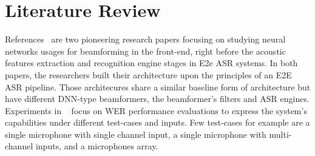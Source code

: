 \bigskip



\section{Literature Review}
References~\cite{7472778, 7952160} are 
two pioneering research papers focusing on 
studying neural networks usages
for beamforming in the front-end, right
before the acoustic features extraction and
recognition engine stages in E2e ASR systems.
In both papers, the researchers built their architecture
upon the principles of an E2E ASR pipeline.
Those architecures share a similar baseline form of
architecture but have different
DNN-type beamformers, the beamformer's filters and ASR engines.
Experiments in ~\cite{7472778, 7952160}
focus on WER performance evaluations to express
the system's capabilities under 
different test-cases and inputs.
Few test-cases for example are a single microphone 
with single channel input,
a single microphone with multi-channel inputs,
and a microphones array.

